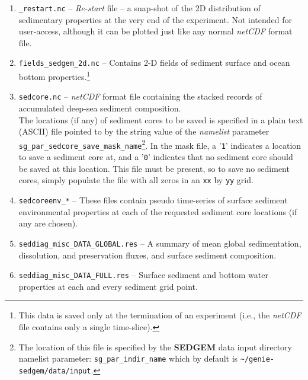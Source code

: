 \documentclass[11pt,fleqn]{book} %
\begin{document}
\begin{enumerate}

\vspace{1mm}\item \texttt{\_restart.nc} -- \textit{Re-start} file -- a snap-shot of the 2D distribution of sedimentary properties at the very end of the experiment. Not intended for user-access, although it can be plotted just like any normal \textit{netCDF} format file.

\vspace{1mm}\item \texttt{fields\_sedgem\_2d.nc} -- Contains 2-D fields of sediment surface and ocean bottom properties.\footnote{This data is saved only at the termination of an experiment (i.e., the \textit{netCDF} file contains only a single time-slice).}

\vspace{1mm}\item \texttt{sedcore.nc} -- \textit{netCDF} format file containing the stacked records of accumulated deep-sea sediment composition.
\\The locations (if any) of sediment cores to be saved is specified in a plain text (ASCII) file pointed to by the string value of the \textit{namelist} parameter \texttt{sg\_par\_sedcore\_save\_mask\_name}\footnote{The location of this file is specified by the \textbf{SEDGEM} data input directory namelist parameter: \texttt{sg\_par\_indir\_name} which by default is \texttt{\~{}/genie-sedgem/data/input}.}. In the mask file, a '\texttt{1}' indicates a location to save a sediment core at, and a '\texttt{0}' indicates that no sediment core should be saved at this location.       This file must be present, so to save no sediment cores, simply populate the file with all zeros in an \texttt{xx} by \texttt{yy} grid.

\vspace{1mm}\item \texttt{sedcoreenv\_*} -- These files contain pseudo time-series of surface sediment environmental properties at each of the requested sediment core locations (if any are chosen).

\vspace{1mm}\item \texttt{seddiag\_misc\_DATA\_GLOBAL.res} -- A summary of mean global sedimentation, dissolution, and preservation fluxes, and surface sediment composition.

\vspace{1mm}\item \texttt{seddiag\_misc\_DATA\_FULL.res} -- Surface sediment and bottom water properties at each and every sediment grid point.

\end{enumerate}\vspace{2mm}
\end{document}
